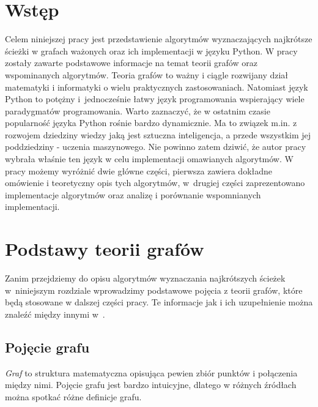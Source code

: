 \documentclass[12pt,a4paper]{book}
\theoremstyle{definition}
\numberwithin{equation}{chapter}
\begin{document}
\chapter*{Wstęp} 
Celem niniejszej pracy jest przedstawienie algorytmów wyznaczających najkrótsze ścieżki w grafach ważonych oraz ich implementacji w języku Python. W pracy zostały zawarte podstawowe informacje na temat teorii grafów oraz wspominanych algorytmów. Teoria grafów to ważny i ciągle rozwijany dział matematyki i informatyki o wielu praktycznych zastosowaniach. Natomiast język Python to potężny i~jednocześnie łatwy język programowania wspierający wiele paradygmatów programowania. Warto zaznaczyć, że w ostatnim czasie popularność języka Python rośnie bardzo dynamicznie. Ma to związek m.in. z rozwojem dziedziny wiedzy jaką jest sztuczna inteligencja, a przede wszystkim jej poddziedziny - uczenia maszynowego.  Nie powinno zatem dziwić, że autor pracy wybrała właśnie ten język w celu implementacji omawianych algorytmów. W pracy możemy wyróżnić dwie główne części, pierwsza zawiera dokładne omówienie i teoretyczny opis tych algorytmów, w~drugiej części zaprezentowano implementacje algorytmów oraz analizę i porównanie wspomnianych implementacji. 


\chapter{Podstawy teorii grafów}\label{ch_1}
Zanim przejdziemy do opisu algorytmów wyznaczania najkrótszych ścieżek w~niniejszym rozdziale wprowadzimy podstawowe pojęcia z teorii grafów, które będą stosowane w dalszej części pracy. Te informacje jak
i ich uzupełnienie można znaleźć między innymi w~\cite{CORMEN, KOR&LYCZ, WOJ&PIEN}.

\section{Pojęcie grafu}
\textit{Graf} to struktura matematyczna opisująca pewien zbiór punktów i połączenia między nimi. Pojęcie grafu jest bardzo intuicyjne, dlatego w różnych źródłach można spotkać różne definicje grafu.
\end{document}
